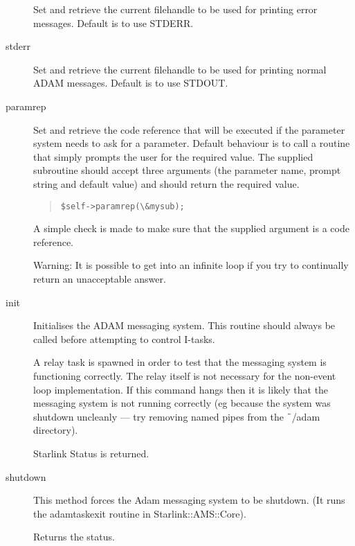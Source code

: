 \documentclass[twoside,11pt]{article}
\newenvironment{myquote}{\begin{quote}\begin{small}}{\end{small}\end{quote}}
\renewcommand{\_}{\texttt{\symbol{95}}}
\begin{document}
\begin{description}
Set and retrieve the current filehandle to be used for printing
error messages. Default is to use STDERR.

\item[stderr] \mbox{}

Set and retrieve the current filehandle to be used for printing
normal ADAM messages. Default is to use STDOUT.

\item[paramrep] \mbox{}

Set and retrieve the code reference that will be executed if
the parameter system needs to ask for a parameter.
Default behaviour is to call a routine that simply prompts
the user for the required value. The supplied subroutine
should accept three arguments (the parameter name, prompt string and
default value) and should return the required value.
\begin{myquote}
\begin{verbatim}
$self->paramrep(\&mysub);
\end{verbatim}
\end{myquote} %

A simple check is made to make sure that the supplied argument
is a code reference.

Warning: It is possible to get into an infinite loop if you try
to continually return an unacceptable answer.

\item[init] \mbox{}

Initialises the ADAM messaging system. This routine should always be
called before attempting to control I-tasks.

A relay task is spawned in order to test that the messaging system
is functioning correctly. The relay itself is not necessary for the
non-event loop implementation. If this command hangs then it is
likely that the messaging system is not running correctly (eg
because the system was shutdown uncleanly --- try removing named pipes
from the $\tilde{\hspace{0.4em}}$/adam directory).

Starlink Status is returned.

\item[shutdown] \mbox{}

This method forces the Adam messaging system to be shutdown.
(It runs the adamtask\_exit routine in Starlink::AMS::Core).

Returns the status.

\end{description}
\end{document}
